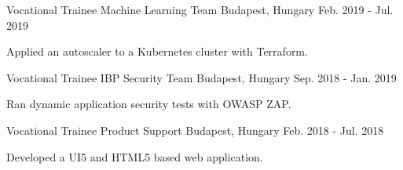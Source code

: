 \begin{cventries}
  \cventry
    {Vocational Trainee} %
    {Machine Learning Team} %
    {Budapest, Hungary} %
    {Feb. 2019 - Jul. 2019} %
    {
      \begin{cvitems} %
        \item {Applied an autoscaler to a Kubernetes cluster with Terraform.}
      \end{cvitems}
    }

  \cventry
    {Vocational Trainee} %
    {IBP Security Team} %
    {Budapest, Hungary} %
    {Sep. 2018 - Jan. 2019} %
    {
      \begin{cvitems} %
        \item {Ran dynamic application security tests with OWASP ZAP.}
      \end{cvitems}
    }

  \cventry
    {Vocational Trainee} %
    {Product Support} %
    {Budapest, Hungary} %
    {Feb. 2018 - Jul. 2018} %
    {
      \begin{cvitems} %
        \item {Developed a UI5 and HTML5 based web application.}
      \end{cvitems}
    }


\end{cventries}
